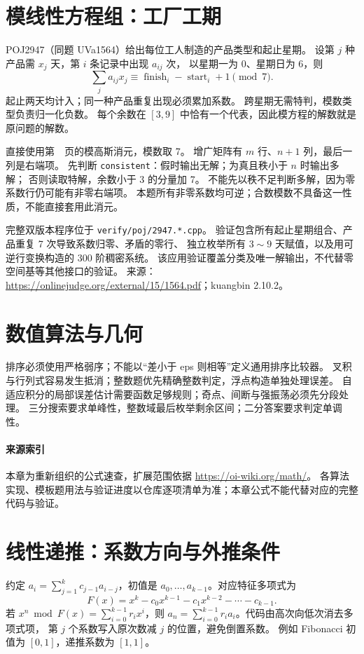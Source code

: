 \section{模线性方程组：工厂工期}\label{knowledge-widget-gauss}
POJ2947（同题 UVa1564）给出每位工人制造的产品类型和起止星期。
设第 $j$ 种产品需 $x_j$ 天，第 $i$ 条记录中出现 $a_{ij}$ 次，
以星期一为 0、星期日为 6，则
\[
\sum_j a_{ij}x_j\equiv \operatorname{finish}_i-\operatorname{start}_i+1\pmod7.
\]
起止两天均计入；同一种产品重复出现必须累加系数。
跨星期无需特判，模数类型负责归一化负数。
每个余数在 $[3,9]$ 中恰有一个代表，因此模方程的解数就是原问题的解数。

直接使用第~\pageref{compact-GaussMod}~页的模高斯消元，模数取 7。
增广矩阵有 $m$ 行、$n+1$ 列，最后一列是右端项。
先判断 \texttt{consistent}：假时输出无解；为真且秩小于 $n$ 时输出多解；
否则读取特解，余数小于 3 的分量加 7。
不能先以秩不足判断多解，因为零系数行仍可能有非零右端项。
本题所有非零系数均可逆；合数模数不具备这一性质，不能直接套用此消元。

完整双版本程序位于 \texttt{verify/poj/2947.*.cpp}。
验证包含所有起止星期组合、产品重复 7 次导致系数归零、矛盾的零行、
独立枚举所有 $3\!\sim\!9$ 天赋值，以及用可逆行变换构造的 300 阶稠密系统。
该应用验证覆盖分类及唯一解输出，不代替零空间基等其他接口的验证。
来源：\url{https://onlinejudge.org/external/15/1564.pdf}；kuangbin 2.10.2。

\section{数值算法与几何}\label{knowledge-numerical-boundaries}
排序必须使用严格弱序；不能以“差小于 eps 则相等”定义通用排序比较器。
叉积与行列式容易发生抵消；整数题优先精确整数判定，浮点构造单独处理误差。
自适应积分的局部误差估计需要函数足够规则；奇点、间断与强振荡必须先分段处理。
三分搜索要求单峰性，整数域最后枚举剩余区间；二分答案要求判定单调性。

\paragraph{来源索引}
本章为重新组织的公式速查，扩展范围依据 \url{https://oi-wiki.org/math/}。
各算法实现、模板题用法与验证进度以仓库逐项清单为准；本章公式不能代替对应的完整代码与验证。

\section{线性递推：系数方向与外推条件}\label{knowledge-recurrence-direction}
约定 $a_i=\sum_{j=1}^{k}c_{j-1}a_{i-j}$，初值是
$a_0,\ldots,a_{k-1}$。对应特征多项式为
\[
F(x)=x^k-c_0x^{k-1}-c_1x^{k-2}-\cdots-c_{k-1}.
\]
若 $x^n\bmod F(x)=\sum_{i=0}^{k-1}r_ix^i$，则
$a_n=\sum_{i=0}^{k-1}r_ia_i$。代码由高次向低次消去多项式项，
第 $j$ 个系数写入原次数减 $j$ 的位置，避免倒置系数。
例如 Fibonacci 初值为 $[0,1]$，递推系数为 $[1,1]$。


